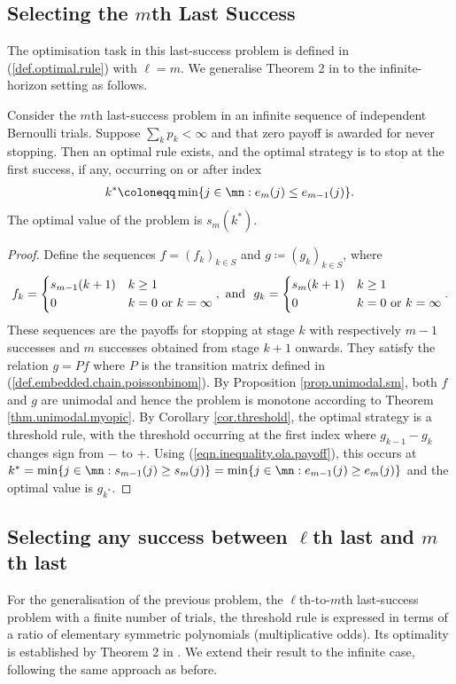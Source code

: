\documentclass[11pt]{article}
\begin{document}
\subsection{Selecting the $m$th Last Success}
The optimisation task in this last-success problem is  defined in (\ref{def.optimal.rule}) with $\ell=m$. 
We generalise Theorem 2 in \cite{BrussPaindaveine}  to the infinite-horizon setting as follows.
\begin{thm}\label{thm:unimodality.lastm.infinite}
	Consider the {$m$th  last-success} problem in an infinite sequence of independent Bernoulli trials. Suppose  $\sum_k p_k < \infty$ and  that zero payoff is awarded for never stopping. Then an optimal rule exists,  and the optimal strategy is to stop at the first success, if any, occurring on or after index
	\begin{alignat*}{2} 
		k^* \coloneqq \min\{j \in \mn: e_m(j) \le  e_{m-1}(j)\}.
	\end{alignat*}
	The optimal value of the problem is  $s_m(k^*)$.		
\end{thm}
\begin{proof}
Define the sequences  $f=(f_k)_{k \in S}$ and $g \coloneqq (g_k)_{k \in S}$, where  
$$
f_k = \begin{dcases}
	s_{m-1}(k+1) & k \ge 1 \\
	0 & k=0 \text{ or } k = \infty
\end{dcases}, \text{ and }~
g_k = \begin{dcases}
	s_{m}(k+1) & k \ge 1 \\
	0 & k=0 \text{ or } k = \infty
\end{dcases}.
$$
These sequences are the payoffs for stopping at stage $k$ with  respectively $m-1$ successes and $m$ successes obtained from stage $k+1$ onwards.  They satisfy the relation $g=Pf$ where $P$ is the transition matrix defined in (\ref{def.embedded.chain.poissonbinom}).  By Proposition \ref{prop.unimodal.sm}, both $f$ and $g$ are unimodal and hence  the problem is monotone according to Theorem \ref{thm.unimodal.myopic}. By Corollary \ref{cor.threshold},  the optimal strategy is a threshold rule, with the threshold  occurring at the first index where $g_{k-1} - g_k$ changes sign from $-$ to $+$. Using (\ref{eqn.inequality.ola.payoff}), this occurs at $k^*= \min \{ j \in \mn: s_{m-1}(j) \ge s_{m}(j)\} = \min \{ j \in \mn: e_{m-1}(j) \ge e_{m}(j)\}$ and the optimal value is $g_{k^*}$.
	\end{proof}
	


\subsection{Selecting any success between $\ell$th last and $m$th last}
For the generalisation of the previous problem, the \( \ell \)th-to-\( m \)th last-success problem with a finite number of trials, the threshold rule is expressed in terms of a ratio of elementary symmetric polynomials (multiplicative odds). Its optimality is established by Theorem 2 in \cite{MatsuiAno}. We extend their result to the infinite case, following the same approach as before.
\end{document}
